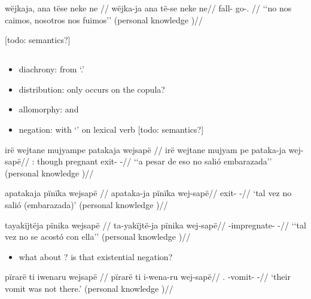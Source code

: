 \documentclass{memoir}
\begin{document}
\ex \label{conv1stenc-28}
\begingl \glpreamble wëjkaja, ana tëse neke ne //
\gla wëjka-ja ana të-se neke ne//
\glb fall-  go-.  //
\glft ‘‘no nos caimos, nosotros nos fuimos’’ (personal knowledge
)//
\endgl
\xe

{[}todo: semantics?{]}

\subsection{\texorpdfstring{}{}}

\begin{itemize}
\tightlist
\item
  diachrony: from  `.'
\item
  distribution: only occurs on the copula?
\item
  allomorphy:  and 
\item
  negation: with  `' on lexical verb
   {[}todo: semantics?{]}
\end{itemize}

\ex \label{ctoaragrme-38}
\begingl \glpreamble irë wejtane mujyampe patakaja wejsapë //
\gla irë wejtane mujyam pe pataka-ja wej-sapë//
\glb {}: though pregnant  exit- -//
\glft ‘‘a pesar de eso no salió embarazada’’ (personal knowledge
)//
\endgl
\xe

\ex \label{ctoaragrme-39}
\begingl \glpreamble apatakaja pïnïka wejsapë //
\gla apataka-ja pïnïka wej-sapë//
\glb exit-  -//
\glft ‘tal vez no salió (embarazada)’ (personal knowledge
)//
\endgl
\xe

\ex \label{ctoaragrme-40}
\begingl \glpreamble tayakïjtëja pïnika wejsapë //
\gla ta-yakïjtë-ja pïnika wej-sapë//
\glb {}-impregnate-  -//
\glft ‘‘tal vez no se acostó con ella’’ (personal knowledge
)//
\endgl
\xe

\begin{itemize}
\tightlist
\item
  what about ? is that existential negation?
\end{itemize}

\ex \label{ctorat-19}
\begingl \glpreamble pïrarë ti iwenaru wejsapë //
\gla pïrarë ti i-wena-ru wej-sapë//
\glb {}.  -vomit- -//
\glft ‘their vomit was not there.’ (personal knowledge
)//
\endgl
\xe
\end{document}
